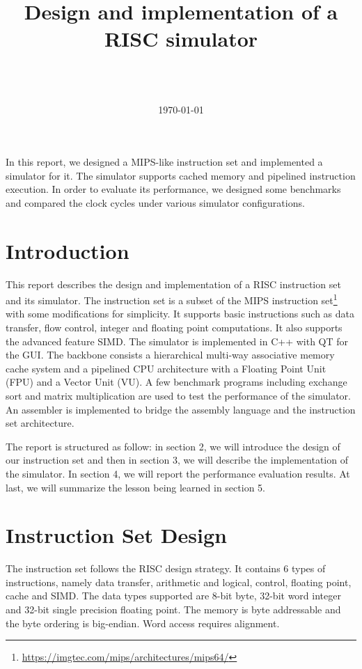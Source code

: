 \documentclass{sig-alternate}
\begin{document}
\title{Design and implementation of a RISC simulator}
\author{
\and
{} \\  \\
}

\date{\today}
\maketitle
\abstract
In this report, we designed a MIPS-like instruction set and implemented a simulator for it. The simulator supports cached memory and pipelined instruction execution. In order to evaluate its performance, we designed some benchmarks and compared the clock cycles under various simulator configurations.

\section{Introduction}
This report describes the design and implementation of a RISC instruction set and its simulator. The instruction set is a subset of the MIPS instruction set\footnote{\url{https://imgtec.com/mips/architectures/mips64/}} with some modifications for simplicity. It supports basic instructions such as data transfer, flow control, integer and floating point computations. It also supports the advanced feature SIMD. The simulator is implemented in C++ with QT for the GUI. The backbone consists a hierarchical multi-way associative memory cache system and a pipelined CPU architecture with a Floating Point Unit (FPU) and a Vector Unit (VU). A few benchmark programs including exchange sort and matrix multiplication are used to test the performance of the simulator. An assembler is implemented to bridge the assembly language and the instruction set architecture.

The report is structured as follow: in section 2, we will introduce the design of our instruction set and then in section 3, we will describe the implementation of the simulator. In section 4, we will report the performance evaluation results.  At last, we will summarize the lesson being learned in section 5.

\section{Instruction Set Design}
The instruction set follows the RISC design strategy. It contains 6 types of instructions, namely data transfer, arithmetic and logical, control, floating point, cache and SIMD. The data types supported are 8-bit byte, 32-bit word integer and 32-bit single precision floating point. The memory is byte addressable and the byte ordering is big-endian. Word access requires alignment. 
\end{document}
